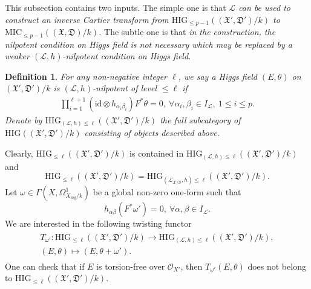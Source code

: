 \documentclass[12pt, a4paper]{article}
\newtheorem{definition}{Definition}[section]
\begin{document}
This subsection contains two inputs. The simple one is that {\itshape $\mathcal L$ can be used to construct an inverse Cartier transform from $\mathrm{HIG}_{\leq p-1}((\mathfrak X',\mathfrak D')/k)$ to $\mathrm{MIC}_{\leq p-1}((\mathfrak X,\mathfrak D)/k)$.} The subtle one is that {\itshape in the construction, the nilpotent condition on Higgs field is not necessary which may be replaced by a weaker $(\mathcal L,h)$-nilpotent condition on Higgs field.}
\begin{definition}
For any non-negative integer $\ell$, we say a Higgs field $(E,\theta)$ on $(\mathfrak X',\mathfrak D')/k$ is $(\mathcal L,h)$-nilpotent of level $\leq\ell$ if
\begin{eqnarray}\label{nilpotent h}
\prod_{i=1}^{\ell+1}(\mathrm{id}\otimes h_{\alpha_i\beta_i})F^*\theta=0,~\forall\alpha_i,\beta_i\in I_{\mathcal L},~1\leq i\leq p.
\end{eqnarray}
Denote by $\mathrm{HIG}_{(\mathcal L,h)\leq\ell}((\mathfrak X',\mathfrak D')/k)$ the full subcategory of $\mathrm{HIG}((\mathfrak X',\mathfrak D')/k)$ consisting of objects described above.
\end{definition}
Clearly, $\mathrm{HIG}_{\leq\ell}((\mathfrak X',\mathfrak D')/k)$ is contained in $\mathrm{HIG}_{(\mathcal L,h)\leq\ell}((\mathfrak X',\mathfrak D')/k)$ and
$$
\mathrm{HIG}_{\leq\ell}((\mathfrak X',\mathfrak D')/k)=\mathrm{HIG}_{(\mathcal L_{\mathcal X/\mathcal S},h)\leq\ell}((\mathfrak X',\mathfrak D')/k).$$
Let $\omega\in\Gamma(X,\Omega^1_{X_{\log}/k})$ be a global non-zero one-form such that
$$
h_{\alpha\beta}(F^*\omega')=0,~\forall\alpha,\beta\in I_{\mathcal L}.
$$
We are interested in the following twisting functor
\begin{eqnarray}\label{twisting functor}
\begin{array}{c}
T_{\omega'}:\mathrm{HIG}_{\leq\ell}((\mathfrak X',\mathfrak D')/k)\to\mathrm{HIG}_{(\mathcal L,h)\leq \ell}((\mathfrak X',\mathfrak D')/k),\\
(E,\theta)\mapsto (E,\theta+\omega').
\end{array}
\end{eqnarray}
One can check that if $E$ is torsion-free over $\mathcal O_{X'}$, then $T_{\omega'}(E,\theta)$ does not belong to $\mathrm{HIG}_{\leq\ell}((\mathfrak X',\mathfrak D')/k)$.
\end{document}
